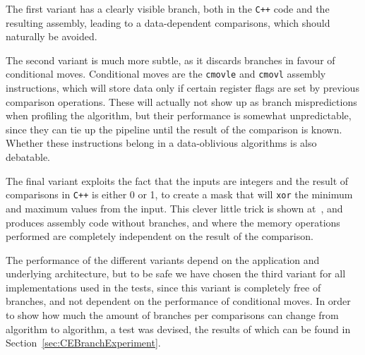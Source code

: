 The first variant has a clearly visible branch, both in the \texttt{C++} code and the resulting assembly, leading to a data-dependent comparisons, which should naturally be avoided.

The second variant is much more subtle, as it discards branches in favour of conditional moves. Conditional moves are the \texttt{cmovle} and \texttt{cmovl} assembly instructions, which will store data only if certain register flags are set by previous comparison operations. These will actually not show up as branch mispredictions when profiling the algorithm, but their performance is somewhat unpredictable, since they can tie up the pipeline until the result of the comparison is known. Whether these instructions belong in a data-oblivious algorithms is also debatable.

The final variant exploits the fact that the inputs are integers and the result of comparisons in \texttt{C++} is either 0 or 1, to create a mask that will \texttt{xor} the minimum and maximum values from the input. This clever little trick is shown at~, and produces assembly code without branches, and where the memory operations performed are completely independent on the result of the comparison.

The performance of the different variants depend on the application and underlying architecture, but to be safe we have chosen the third variant for all implementations used in the tests, since this variant is completely free of branches, and not dependent on the performance of conditional moves. In order to show how much the amount of branches per comparisons can change from algorithm to algorithm, a test was devised, the results of which can be found in Section~\ref{sec:CEBranchExperiment}.



